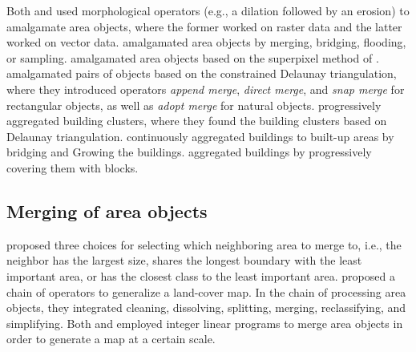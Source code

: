 \documentclass[twocolumn]{svjour3}          %
\begin{document}


Both \citet{Su1997aggregation} and \citet{Sester2005Optimization} 
used morphological operators (e.g., a dilation followed by an erosion)
to amalgamate area objects, 
where the former worked on raster data and the latter worked on vector data.
\citet{Regnauld2003Amalgamation} 
amalgamated area objects
by merging, bridging, flooding, or sampling. 
\citet{Shen2019Aggregation} amalgamated area objects
based on the superpixel method of \citet{Achanta2012SLIC}.
\citet{Ware1995Areal} amalgamated pairs of objects 
based on the constrained Delaunay triangulation,
where they introduced operators 
\emph{append merge}, \emph{direct merge}, and \emph{snap merge}
for rectangular objects, as well as \emph{adopt merge} for natural objects. 
\citet{Ai2007Aggregation} progressively aggregated building clusters,
where they found the building clusters based on Delaunay triangulation.
\citet{Peng2017Building} continuously aggregated buildings to built-up areas 
by bridging and Growing the buildings.
\citet{Touya2017Progressive} aggregated buildings 
by progressively covering them with blocks.













\subsection{Merging of area objects}
\citet{Cheng2006} proposed three choices for 
selecting which neighboring area to merge to, i.e.,
the neighbor has the largest size, 
shares the longest boundary with the least important area,
or has the closest class to the least important area.
\citet{Thiemann2018LandCover} proposed a chain of operators 
to generalize a land-cover map.
In the chain of processing area objects, 
they integrated cleaning, dissolving, splitting, 
merging, reclassifying, and simplifying.
Both \cite{HaunertWolff2010AreaAgg} and \cite{Oehrlein2017Aggregation} 
employed integer linear programs to merge area objects
in order to generate a map at a certain scale.
\end{document}
